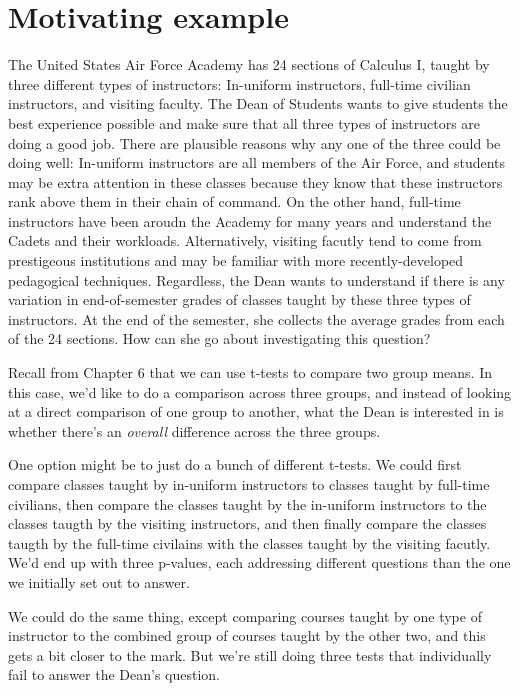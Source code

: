 \documentclass[
]{book}
\theoremstyle{definition}
\theoremstyle{definition}
\theoremstyle{definition}
\theoremstyle{remark}
\begin{document}
\hypertarget{motivating-example}{%
\chapter{Motivating example}\label{motivating-example}}

The United States Air Force Academy has 24 sections of Calculus I, taught by three different types of instructors: In-uniform instructors, full-time civilian instructors, and visiting faculty. The Dean of Students wants to give students the best experience possible and make sure that all three types of instructors are doing a good job. There are plausible reasons why any one of the three could be doing well: In-uniform instructors are all members of the Air Force, and students may be extra attention in these classes because they know that these instructors rank above them in their chain of command. On the other hand, full-time instructors have been aroudn the Academy for many years and understand the Cadets and their workloads. Alternatively, visiting facutly tend to come from prestigeous institutions and may be familiar with more recently-developed pedagogical techniques. Regardless, the Dean wants to understand if there is any variation in end-of-semester grades of classes taught by these three types of instructors. At the end of the semester, she collects the average grades from each of the 24 sections. How can she go about investigating this question?

Recall from Chapter 6 that we can use t-tests to compare two group means. In this case, we'd like to do a comparison across three groups, and instead of looking at a direct comparison of one group to another, what the Dean is interested in is whether there's an \emph{overall} difference across the three groups.

One option might be to just do a bunch of different t-tests. We could first compare classes taught by in-uniform instructors to classes taught by full-time civilians, then compare the classes taught by the in-uniform instructors to the classes taugth by the visiting instructors, and then finally compare the classes taugth by the full-time civilains with the classes taught by the visiting facutly. We'd end up with three p-values, each addressing different questions than the one we initially set out to answer.

We could do the same thing, except comparing courses taught by one type of instructor to the combined group of courses taught by the other two, and this gets a bit closer to the mark. But we're still doing three tests that individually fail to answer the Dean's question.
\end{document}
